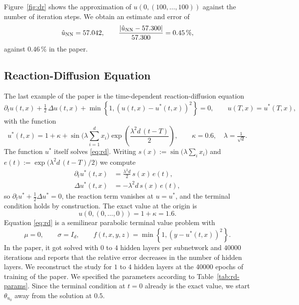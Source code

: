 ﻿\documentclass[10pt,a4paper]{article}
\begin{document}
Figure~\ref{fig:dr} shows the approximation of $u(0,(100,\dots,100))$
against the number of iteration steps. We obtain an estimate and error of
\begin{equation}
\hat u_{\mathrm{NN}} = 57.042,
\qquad
\frac{\left|\hat u_{\mathrm{NN}} - 57.300\right|}{57.300}
= 0.45\,\%,
\end{equation}
against $0.46\,\%$ in the paper.


\subsection{Reaction-Diffusion Equation}
\label{sec:rd}
The last example of the paper is the time-dependent reaction-diffusion equation
\begin{equation}
\partial_t u(t,x) + \tfrac12\,\Delta u(t,x)
+ \min\!\left\{1,\left(u(t,x) - u^{*}(t,x)\right)^2\right\} = 0,
\qquad
u(T,x) = u^{*}(T,x),
\label{eq:rd}
\end{equation}
with the function
\begin{equation*}
u^{*}(t,x) = 1 + \kappa
+ \sin\!\Big(\lambda\sum_{i=1}^{d} x_i\Big)
\exp\!\left(\frac{\lambda^2 d\,(t-T)}{2}\right),
\qquad
\kappa = 0.6,
\quad
\lambda = \tfrac{1}{\sqrt d}.
\end{equation*}
The function $u^{*}$ itself solves \eqref{eq:rd}. Writing $s(x) := \sin\!\big(\lambda\sum_i x_i\big)$ and
$e(t) := \exp\!\big(\lambda^2 d\,(t-T)/2\big)$ we compute
\begin{align}
\partial_t u^{*}(t,x) &= \frac{\lambda^2 d}{2}\, s(x)\, e(t),
\nonumber\\
\Delta u^{*}(t,x) &= -\lambda^2 d\, s(x)\, e(t),
\end{align}
so $\partial_t u^{*} + \tfrac12\Delta u^{*} = 0$, the reaction term vanishes at $u = u^{*}$, and the terminal condition holds by construction. The exact value at the origin is
\begin{equation}
u(0,(0,\dots,0)) = 1 + \kappa = 1.6 .
\end{equation}
Equation \eqref{eq:rd} is a semilinear parabolic terminal value problem with
\begin{equation}
\mu = 0,
\qquad
\sigma = I_d,
\qquad
f(t,x,y,z) = \min\!\left\{1,\left(y - u^{*}(t,x)\right)^2\right\}.
\end{equation}
In the paper, it got solved with $0$ to $4$ hidden layers per subnetwork and $40000$ iterations and reports that the relative error
decreases in the number of hidden layers. We reconstruct the study for
$1$ to $4$ hidden layers at the 40000 epochs of training of the paper. We specified the parameters according to Table~\ref{tab:rd-params}. Since
the terminal condition at $t=0$ already is the exact value, we
start $\theta_{u_0}$ away from the solution at $0.5$.
\end{document}
